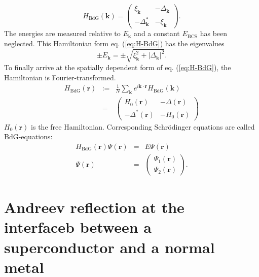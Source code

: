 \begin{equation}
H_\text{BdG}\left(\mathbf{k} \right) = \begin{pmatrix}
\xi_\mathbf{k} &  - \Delta_\mathbf{k}\\
- \Delta^*_\mathbf{k} & - \xi_\mathbf{k}
\end{pmatrix} \label{eq:H-BdG}.
\end{equation}
The energies are measured relative to $E_\mathbf{k}$ and a constant $E_\text{BCS}$ has been neglected.
This Hamiltonian form eq. (\ref{eq:H-BdG}) has the eigenvalues
\begin{equation}
 \pm E_\mathbf{k} = \pm \sqrt{\xi_\mathbf{k}^2 + |\Delta_\mathbf{k}|^2  }.
\end{equation}
To finally arrive at the spatially dependent form of eq. (\ref{eq:H-BdG}), the Hamiltonian is Fourier-transformed.
\begin{eqnarray}
H_\text{BdG} \left( \mathbf{r} \right) &:=& \frac{1}{N} \sum_\mathbf{k} e^{i \mathbf{k \cdot r}} H_\text{BdG}\left( \mathbf{k} \right) \\
&=& \begin{pmatrix}
H_0\left( \mathbf{r} \right)  &  - \Delta \left( \mathbf{r} \right) \\
- \Delta^* \left( \mathbf{r} \right)  & - H_0 \left( \mathbf{r} \right) 
\end{pmatrix} \label{eq:H-BdG-r}
\end{eqnarray}
$H_0 \left( \mathbf{r} \right) $ is the free Hamiltonian. Corresponding Schr\"odinger equations are called BdG-equations:
\begin{eqnarray}
H_\text{BdG} \left( \mathbf{r} \right) \Psi\left( \mathbf{r} \right) &=& E \Psi\left( \mathbf{r} \right)\label{eq:BdG-eq} \\
\Psi\left( \mathbf{r} \right)  &=& \begin{pmatrix}
\Psi_1\left( \mathbf{r} \right) \\ \Psi_2\left( \mathbf{r} \right) 
\end{pmatrix}.\label{eq:BdG-spinor}
\end{eqnarray}

\section{Andreev reflection at the interfaceb between a superconductor and a normal metal}\label{sec:NS}

